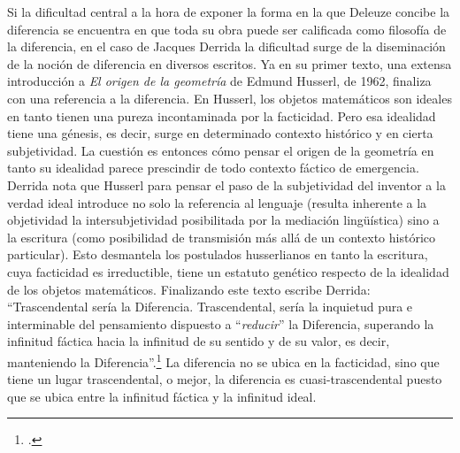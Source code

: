 \documentclass{book}
\begin{document}
Si la dificultad central a la hora de exponer la forma en la que Deleuze
concibe la diferencia se encuentra en que toda su obra puede ser
calificada como filosofía de la diferencia, en el caso de Jacques
Derrida la dificultad surge de la diseminación de la noción de
diferencia en diversos escritos. Ya en su primer texto, una extensa
introducción a \emph{El origen de la geometría} de Edmund Husserl, de
1962, finaliza con una referencia a la diferencia. En Husserl, los
objetos matemáticos son ideales en tanto tienen una pureza incontaminada
por la facticidad. Pero esa idealidad tiene una génesis, es decir, surge
en determinado contexto histórico y en cierta subjetividad. La cuestión
es entonces cómo pensar el origen de la geometría en tanto su idealidad
parece prescindir de todo contexto fáctico de emergencia. Derrida nota
que Husserl para pensar el paso de la subjetividad del inventor a la
verdad ideal introduce no solo la referencia al lenguaje (resulta
inherente a la objetividad la intersubjetividad posibilitada por la
mediación lingüística) sino a la escritura (como posibilidad de
transmisión más allá de un contexto histórico particular). Esto
desmantela los postulados husserlianos en tanto la escritura, cuya
facticidad es irreductible, tiene un estatuto genético respecto de la
idealidad de los objetos matemáticos. Finalizando este texto escribe
Derrida: \enquote{Trascendental sería la Diferencia. Trascendental, sería la
inquietud pura e interminable del pensamiento dispuesto a
``\emph{reducir}'' la Diferencia, superando la infinitud fáctica hacia
la infinitud de su sentido y de su valor, es decir, manteniendo la
Diferencia}.\footcite[162]{derrida2000} La diferencia no se ubica en la facticidad, sino que
tiene un lugar trascendental, o mejor, la diferencia es
cuasi-trascendental puesto que se ubica entre la infinitud fáctica y la
infinitud ideal.
\end{document}
